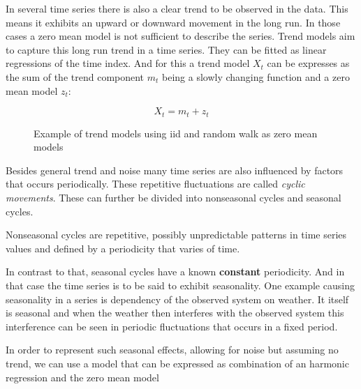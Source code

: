In several time series there is also a clear trend to be observed in the data. This means it exhibits an upward or downward movement in the long run. In those cases a zero mean model is not sufficient to describe the series. 
Trend models aim to capture this long run trend in a time series. They can be fitted as linear regressions of the time index. And for this a trend model \(X_t\) can be expresses as the sum of the trend component \(m_t\) being a slowly changing function and a zero mean model \(z_t\):

\begin{equation}\label{eq:simple_trend_model}
X_t = m_t + z_t
\end{equation}

\begin{figure}[ht]
	\centering
	\caption{Example of trend models using  \acs{iid} and random walk as zero mean models}
\end{figure}

Besides general trend and noise many time series are also influenced by factors that occurs periodically. These repetitive fluctuations are called \textit{cyclic movements}. These can further be divided into nonseasonal cycles and seasonal cycles.

Nonseasonal cycles are repetitive, possibly unpredictable patterns in time series values and defined by a periodicity that varies of time. 

In contrast to that, seasonal cycles have a known \textbf{constant} periodicity. And in that case the time series is to be said to exhibit seasonality.  One example causing seasonality in a series is dependency of the observed system on  weather. It itself is seasonal and when the weather then interferes with the observed system this interference can be seen in periodic fluctuations that occurs in a fixed period.

In order to represent such seasonal effects, allowing for noise but assuming no trend, we can use a model that can be expressed as combination of an harmonic regression and the zero mean model 

